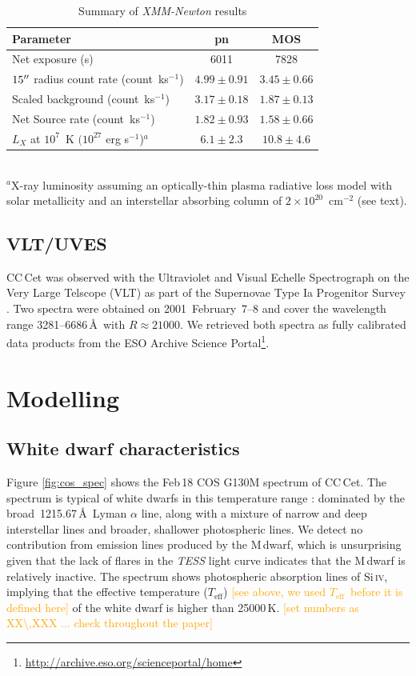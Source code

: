 \documentclass[fleqn,usenatbib]{mnras}
\newcommand{\Ion}[2]{#1{\,\textsc{#2}}}
\newcommand{\Teff}{\mbox{$T_{\mathrm{eff}}$}}
\newcommand{\bgc}[1]{\textcolor{orange}{[#1]}}
\begin{document}
\begin{table} 
\setlength{\tabcolsep}{4pt} %
\caption{Summary of {\it XMM-Newton} results}
\begin{tabular}{lcc}
\hline
Parameter & pn & MOS\\
\hline 
Net exposure (s) & 6011 & 7828 \\
$15\hbox{$^{\prime\prime}$}$ radius count rate  (count~ks$^{-1}$) & $4.99\pm 0.91$ & $3.45\pm 0.66$ \\
Scaled background (count~ks$^{-1}$) & $3.17\pm 0.18$ &  $1.87\pm 0.13$\\
Net Source rate (count~ks$^{-1}$) & $1.82\pm 0.93$ & $1.58\pm 0.66$ \\
$L_X$ at $10^7$~K $(10^{27}$ erg s$^{-1}$)$^a$ & $6.1\pm 2.3$& $10.8\pm 4.6$\\
\hline
\end{tabular} 
\label{t:xmm} \\
{\footnotesize $^a$X-ray luminosity assuming an optically-thin plasma radiative loss model with solar metallicity and an interstellar absorbing column of $2\times 10^{20}$~cm$^{-2}$ (see text).}
\end{table} 

\subsection{VLT/UVES}
CC\,Cet was observed with the Ultraviolet and Visual Echelle Spectrograph \citep[UVES,][]{Dekkeretal00-1} on the Very Large Telscope (VLT) as part of the Supernovae Type Ia Progenitor Survey  \citep[SPY,][]{napiwotzkietal20-1, koesteretal09-2}. Two spectra were obtained on 2001~February~7--8 and cover the wavelength range 3281--6686\,\AA\ with $R\approx21000$. We retrieved both spectra as fully calibrated data products from the ESO Archive Science Portal\footnote{\url{http://archive.eso.org/scienceportal/home}}.


\section{Modelling}
\label{sec:models}
\subsection{White dwarf characteristics}
\label{sec:wdparams}
Figure \ref{fig:cos_spec} shows the Feb\,18 COS G130M spectrum of CC\,Cet. The spectrum is typical of white dwarfs in this temperature range \citep{koesteretal14-1}: dominated by the broad \,1215.67\,\AA\ Lyman $\alpha$ line, along with a mixture of narrow and deep interstellar lines and broader, shallower photospheric lines. We detect no contribution from emission lines produced by the M\,dwarf, which is unsurprising given that the lack of flares in the \textit{TESS} light curve indicates that the M\,dwarf is relatively inactive. The spectrum shows photospheric absorption lines of \Ion{Si}{iv}, implying that the effective temperature (\Teff) \bgc{see above, we used \Teff\ before it is defined here} of the white dwarf is higher than 25000\,K. \bgc{set numbers as XX\textbackslash{,}XXX ... check throughout the paper}
\end{document}
